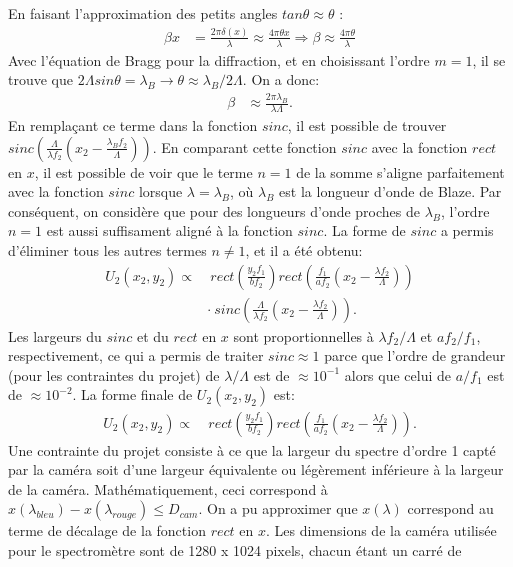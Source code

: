 \documentclass[conference]{IEEEtran}
\begin{document}
En faisant l'approximation des petits angles $tan\theta\approx\theta$ :
\begin{align*}
   \beta x &=\frac{2\pi\delta(x)}{\lambda} \approx\frac{4\pi\theta x}{\lambda} \Rightarrow\beta\approx \frac{4\pi\theta}{\lambda}
\end{align*} 
Avec l'équation de Bragg pour la diffraction, et en choisissant l'ordre $m=1$, il se trouve que $2\Lambda sin\theta=\lambda_B \rightarrow \theta\approx\lambda_B/2\Lambda$.
On a donc:
\begin{align*}
   \beta&\approx \frac{2\pi\lambda_B}{\lambda\Lambda}.
\end{align*}
En remplaçant ce terme dans la fonction $sinc$, il est possible de trouver $sinc(\frac{\Lambda}{\lambda f_2}(x_2-\frac{\lambda_B f_2}{\Lambda}))$. En comparant cette
fonction $sinc$ avec la fonction $rect$ en $x$, il est possible de voir que le terme $n=1$ de la somme s'aligne parfaitement 
avec la fonction $sinc$ lorsque $\lambda=\lambda_B$, où $\lambda_B$ est la longueur d'onde de Blaze. Par conséquent, on considère que pour des longueurs d'onde proches
de $\lambda_B$, l'ordre $n=1$ est aussi suffisament aligné à la fonction $sinc$. La forme de $sinc$ a permis d'éliminer tous les autres termes $n\neq1$, et il a été obtenu:
\begin{align*}
    U_2(x_2,y_2)\propto&\ rect(\frac{y_2 f_1}{b f_2})rect(\frac{f_1}{a f_2}(x_2-\frac{\lambda f_2}{\Lambda}))\\
    & \cdot\ sinc(\frac{\Lambda}{\lambda f_2}(x_2-\frac{\lambda f_2}{\Lambda})).
\end{align*}
Les largeurs du $sinc$ et du $rect$ en $x$ sont proportionnelles à $\lambda f_2/\Lambda$ et $af_2/f_1$, respectivement, ce qui
a permis de traiter $sinc\approx1$ parce que l'ordre de grandeur (pour les contraintes du projet) de $\lambda/\Lambda$ est de $\approx10^{-1}$ alors que celui de $a/f_1$ est
de $\approx10^{-2}$. La forme finale de $U_2(x_2,y_2)$ est:
\begin{align*}
    U_2(x_2,y_2)\propto&\ rect(\frac{y_2 f_1}{b f_2})rect(\frac{f_1}{a f_2}(x_2-\frac{\lambda f_2}{\Lambda})).
\end{align*}
Une contrainte du projet consiste à ce que la largeur du spectre d'ordre 1 capté par la caméra
soit d'une largeur équivalente ou légèrement inférieure à la largeur de la caméra. Mathématiquement, ceci correspond à
$x(\lambda_{bleu})-x(\lambda_{rouge})\leq D_{cam}$. On a pu approximer que $x(\lambda)$ correspond au terme de décalage
de la fonction $rect$ en $x$. Les dimensions de la caméra utilisée pour le spectromètre sont de 1280 x 1024 pixels, chacun étant un carré de
\end{document}
